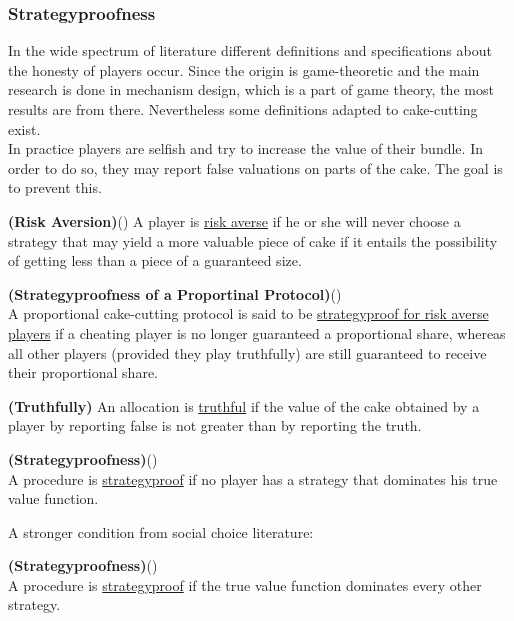\subsubsection{Strategyproofness}
In the wide spectrum of literature different definitions and specifications about the honesty of players occur. Since the origin is game-theoretic and the main research is done in mechanism design, which is a part of game theory, the most results are from there. Nevertheless some definitions adapted to cake-cutting exist.\\
In practice players are selfish and try to increase the value of their bundle. In order to do so, they may report false valuations on parts of the cake. The goal is to prevent this.
\begin{defi}{\textbf{(Risk Aversion)}}(\cite{brams})
A player is \underline{risk averse} if he or she will never choose a strategy that may yield a more valuable piece of cake if it entails the possibility of getting less than a piece of a guaranteed size.
\end{defi}
\begin{defi}{\textbf{(Strategyproofness of a Proportinal Protocol)}}(\cite{lindner:degrees})\\
A proportional cake-cutting protocol is said to be \underline{strategyproof for risk averse players} if a cheating player is no longer guaranteed a proportional share, whereas all other players (provided they play truthfully) are still guaranteed to receive their proportional share.
\end{defi}
\begin{defi}{\textbf{(Truthfully)}}
An allocation is \underline{truthful} if the value of the cake obtained by a player by reporting false is not greater than by reporting the truth.
\end{defi}

\begin{defi}{\textbf{(Strategyproofness)}}(\cite{pie})\\
A procedure is \underline{strategyproof} if no player has a strategy that dominates his true value function.
\end{defi}

A stronger condition from social choice literature:

\begin{defi}{\textbf{(Strategyproofness)}}(\cite{why})\\
A procedure is \underline{strategyproof} if the true value function dominates every other strategy.
\end{defi}

